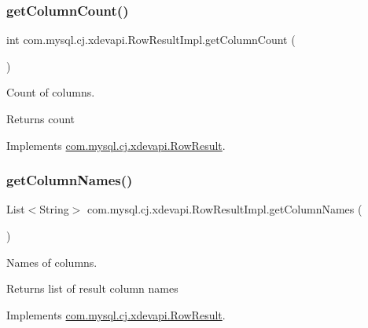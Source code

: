\subsubsection{\texorpdfstring{get\+Column\+Count()}{getColumnCount()}}
{\footnotesize\ttfamily int com.\+mysql.\+cj.\+xdevapi.\+Row\+Result\+Impl.\+get\+Column\+Count (\begin{DoxyParamCaption}{ }\end{DoxyParamCaption})}

Count of columns.

\begin{DoxyReturn}{Returns}
count 
\end{DoxyReturn}


Implements \mbox{\hyperlink{interfacecom_1_1mysql_1_1cj_1_1xdevapi_1_1_row_result_aaf66f729c7c99e7ceb90ea49c4631ef0}{com.\+mysql.\+cj.\+xdevapi.\+Row\+Result}}.

\mbox{\label{classcom_1_1mysql_1_1cj_1_1xdevapi_1_1_row_result_impl_a64fc6e525116d24a678c4538f4f072ae}} 
\subsubsection{\texorpdfstring{get\+Column\+Names()}{getColumnNames()}}
{\footnotesize\ttfamily List$<$String$>$ com.\+mysql.\+cj.\+xdevapi.\+Row\+Result\+Impl.\+get\+Column\+Names (\begin{DoxyParamCaption}{ }\end{DoxyParamCaption})}

Names of columns.

\begin{DoxyReturn}{Returns}
list of result column names 
\end{DoxyReturn}


Implements \mbox{\hyperlink{interfacecom_1_1mysql_1_1cj_1_1xdevapi_1_1_row_result_acbc412c859e4618f3b924c602a82f541}{com.\+mysql.\+cj.\+xdevapi.\+Row\+Result}}.

\mbox{\label{classcom_1_1mysql_1_1cj_1_1xdevapi_1_1_row_result_impl_a080528edc647e5ab131333d69042b167}} 
